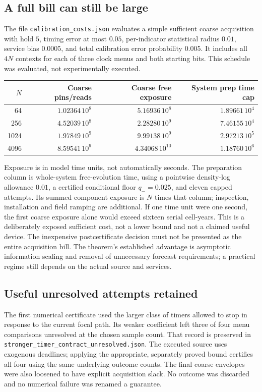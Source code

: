 \subsection{A full bill can still be large}
The file \texttt{calibration\_costs.json} evaluates a simple sufficient coarse acquisition with hold $5$, timing error at most $0.05$, per-indicator statistical radius $0.01$, service bias $0.0005$, and total calibration error probability $0.005$. It includes all $4N$ contexts for each of three clock menus and both starting bits. This schedule was evaluated, not experimentally executed.
\begin{center}
\begin{tabular}{rrrr}
\toprule
$N$&Coarse pins/reads&Coarse free exposure&System prep time cap\\
\midrule
64&$1.02364\,10^8$&$5.16936\,10^8$&$1.89661\,10^4$\\
256&$4.52039\,10^8$&$2.28280\,10^9$&$7.46155\,10^4$\\
1024&$1.97849\,10^9$&$9.99138\,10^9$&$2.97213\,10^5$\\
4096&$8.59541\,10^9$&$4.34068\,10^{10}$&$1.18760\,10^6$\\
\bottomrule
\end{tabular}
\end{center}
Exposure is in model time units, not automatically seconds. The preparation column is whole-system free-evolution time, using a pointwise density-log allowance $0.01$, a certified conditional floor $q_-=0.025$, and eleven capped attempts. Its summed component exposure is $N$ times that column; inspection, installation and field ramping are additional. If one time unit were one second, the first coarse exposure alone would exceed sixteen serial cell-years. This is a deliberately exposed sufficient cost, not a lower bound and not a claimed useful device. The inexpensive postcertificate decision must not be presented as the entire acquisition bill. The theorem's established advantage is asymptotic information scaling and removal of unnecessary forecast requirements; a practical regime still depends on the actual source and services.

\subsection{Useful unresolved attempts retained}
The first numerical certificate used the larger class of timers allowed to stop in response to the current focal path. Its weaker coefficient left three of four menu comparisons unresolved at the chosen sample count. That record is preserved in \texttt{stronger\_timer\_contract\_unresolved.json}. The executed source uses exogenous deadlines; applying the appropriate, separately proved bound certifies all four using the same underlying outcome counts. The final coarse envelopes were also loosened to have explicit acquisition slack. No outcome was discarded and no numerical failure was renamed a guarantee.

